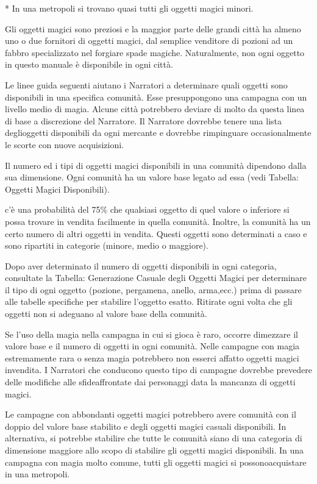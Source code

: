 \documentclass[a4paper,11pt,twoside,openany]{book}
\begin{document}
{{*} In una metropoli si trovano quasi tutti gli oggetti magici minori.

\bigskip

Gli oggetti magici sono preziosi e la maggior parte delle grandi città ha almeno uno o due fornitori di oggetti magici, dal semplice venditore di pozioni ad un fabbro specializzato nel forgiare spade magiche. Naturalmente, non ogni oggetto in questo manuale è disponibile in ogni città.

Le linee guida seguenti aiutano i Narratori a determinare quali oggetti sono disponibili in una specifica comunità. Esse presuppongono una campagna con un livello medio di magia. Alcune città potrebbero deviare di molto da questa linea di base a discrezione del Narratore. Il Narratore dovrebbe tenere una lista deglioggetti disponibili da ogni mercante e dovrebbe rimpinguare occasionalmente le scorte con nuove acquisizioni.

Il numero ed i tipi di oggetti magici disponibili in una comunità dipendono dalla sua dimensione. Ogni comunità ha un valore base legato ad essa (vedi Tabella: Oggetti Magici Disponibili).

c'è una probabilità del 75\% che qualsiasi oggetto di quel valore o inferiore si possa trovare in vendita facilmente in quella comunità. Inoltre, la comunità ha un certo numero di altri oggetti in vendita. Questi oggetti sono determinati a caso e sono ripartiti in categorie (minore, medio o maggiore).

Dopo aver determinato il numero di oggetti disponibili in ogni categoria, consultate la Tabella: Generazione Casuale degli Oggetti Magici per determinare il tipo di ogni oggetto (pozione, pergamena, anello, arma,ecc.) prima di passare alle tabelle specifiche per stabilire l'oggetto esatto. Ritirate ogni volta che gli oggetti non si adeguano al valore base della comunità.

Se l'uso della magia nella campagna in cui si gioca è raro, occorre dimezzare il valore base e il numero di oggetti in ogni comunità. Nelle campagne con magia estremamente rara o senza magia potrebbero non esserci affatto oggetti magici invendita. I Narratori che conducono questo tipo di campagne dovrebbe prevedere delle modifiche alle sfideaffrontate dai personaggi data la mancanza di oggetti magici.

Le campagne con abbondanti oggetti magici potrebbero avere comunità con il doppio del valore base stabilito e degli oggetti magici casuali disponibili. In alternativa, si potrebbe stabilire che tutte le comunità siano di una categoria di dimensione maggiore allo scopo di stabilire gli oggetti magici disponibili. In una campagna con magia molto comune, tutti gli oggetti magici si possonoacquistare in una metropoli.

}
\end{document}
